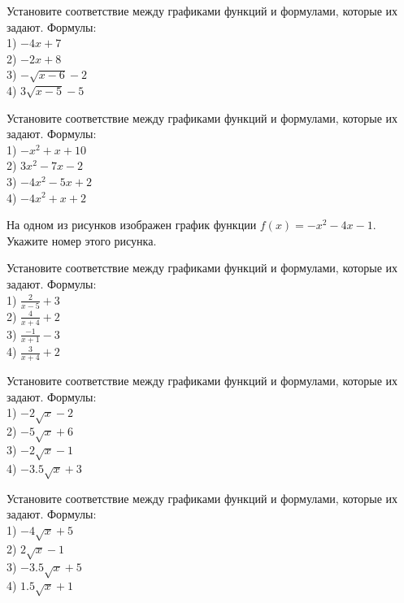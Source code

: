 \documentclass[4apaper]{article}
\begin{document}
\begin{taskBN}{81}
Установите соответствие между графиками функций и формулами, которые их задают. Формулы: \\1) $-4x+7$\\2) $-2x+8$\\3) $-\sqrt{x-6}-2$\\4) $3\sqrt{x-5}-5$
\end{taskBN}

\begin{taskBN}{82}
Установите соответствие между графиками функций и формулами, которые их задают. Формулы: \\1) $-x^2+x+10$\\2) $3x^2-7x-2$\\3) $-4x^2-5x+2$\\4) $-4x^2+x+2$
\end{taskBN}

\begin{taskBN}{83}
На одном из рисунков изображен график функции $f(x)=-x^2-4x-1$. Укажите номер этого рисунка.
\end{taskBN}

\begin{taskBN}{84}
Установите соответствие между графиками функций и формулами, которые их задают. Формулы: \\1) $\frac{2}{x-5}+3$\\2) $\frac{4}{x+4}+2$\\3) $\frac{-1}{x+1}-3$\\4) $\frac{3}{x+4}+2$
\end{taskBN}

\begin{taskBN}{85}
Установите соответствие между графиками функций и формулами, которые их задают. Формулы: \\1) $-2\sqrt{x}-2$\\2) $-5\sqrt{x}+6$\\3) $-2\sqrt{x}-1$\\4) $-3.5\sqrt{x}+3$
\end{taskBN}

\begin{taskBN}{86}
Установите соответствие между графиками функций и формулами, которые их задают. Формулы: \\1) $-4\sqrt{x}+5$\\2) $2\sqrt{x}-1$\\3) $-3.5\sqrt{x}+5$\\4) $1.5\sqrt{x}+1$
\end{taskBN}
\end{document}
